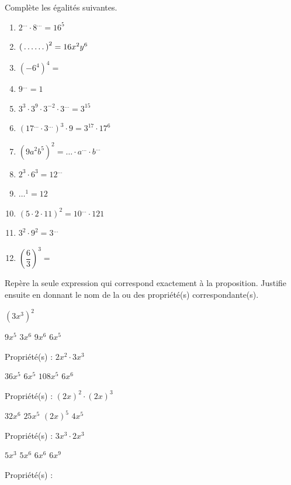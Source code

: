 \documentclass[../math2.tex]{subfiles}
\begin{document}
\pagebreak

\begin{exercise}
	Complète les égalités suivantes.
	\begin{enumerate} [itemsep = 1cm, cols=2]
		\item $2^{\dots}\cdot 8^{\dots}=16^5$
		\item $\left(\dotfillbox [1cm] \right)^2=16x^2y^6$
		\item $\left(-6^4\right)^4=$
		\item $9^{\ldots} = 1$
		\item $3^3\cdot 3^9\cdot 3^{-2}\cdot 3^{\dots}=3^{15}$
		\item $\left(17^{\dots}\cdot 3^{\dots}\right)^3\cdot 9=3^{17}\cdot 17^6$
		\item $\left(9a^2b^5\right)^2=\ldots \cdot a^{\dots} \cdot b^{\dots}$
		\item $2^3\cdot 6^3=12^{\dots}$
		\item $\ldots^{1} = 12$
		\item $\left(5\cdot 2\cdot 11\right)^2=10^{\dots}\cdot 121$
		\item $3^2\cdot 9^2=3^{\dots}$
		\item $\left(\dfrac{6}{3}\right)^3=$
	\end{enumerate}
\end{exercise}

\begin{exercise}
	Repère la seule expression qui correspond exactement à la proposition. Justifie ensuite en donnant le nom de la ou des propriété(s) correspondante(s).
	\begin{tasks}
		\task $(3x^3)^2$
		\begin{qcm}[4]
			\choice $9x^5$
			\choice $3x^6$
			\choice $9x^6$
			\choice $6x^5$
		\end{qcm}
		Propriété(s) : \dotfill
		\task $2x^2\cdot 3x^3$
		\begin{qcm}[4]
			\choice $36x^5$
			\choice $6x^5$
			\choice $108x^5$
			\choice $6x^6$
		\end{qcm}
		Propriété(s) : \dotfill
		\task $(2x)^2\cdot (2x)^3$
		\begin{qcm}[4]
			\choice $32x^6$
			\choice $25x^5$
			\choice $(2x)^5$
			\choice $4x^5$
		\end{qcm}
		Propriété(s) : \dotfill
		\task $3x^3\cdot 2x^3$
		\begin{qcm}[4]
			\choice $5x^3$
			\choice $5x^6$
			\choice $6x^6$
			\choice $6x^9$
		\end{qcm}
		Propriété(s) : \dotfill
	\end{tasks}
\end{exercise}
\end{document}
